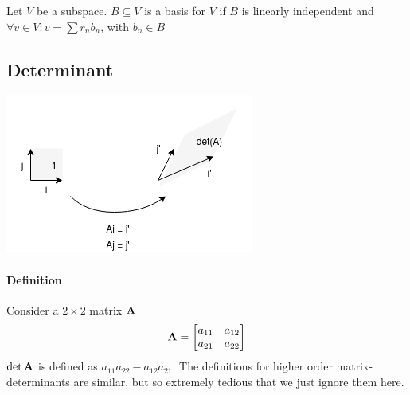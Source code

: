 \begin{definition}
    Let $V$ be a subspace. $B \subseteq V$ is a basis for $V$ if $B$ is linearly independent and $\forall v \in V: v = \sum r_n b_n$, with $b_n \in B$
\end{definition}










\subsection{Determinant}

\includegraphics[width=0.4\linewidth]{images/determinant.png}


\paragraph{Definition} Consider a $2 \times 2$ matrix $\mathbf{A}$ 
$$
\mathbf{A} = 
\begin{bmatrix}
    a_{11} & a_{12} \\
    a_{21} & a_{22}
\end{bmatrix}
$$
$\det{\ensuremath{\mathbf{A}}}$ is defined as $a_{11}a_{22} - a_{12}a_{21}$. The definitions for higher order matrix-determinants are similar, but so extremely tedious that we just ignore them here. 

